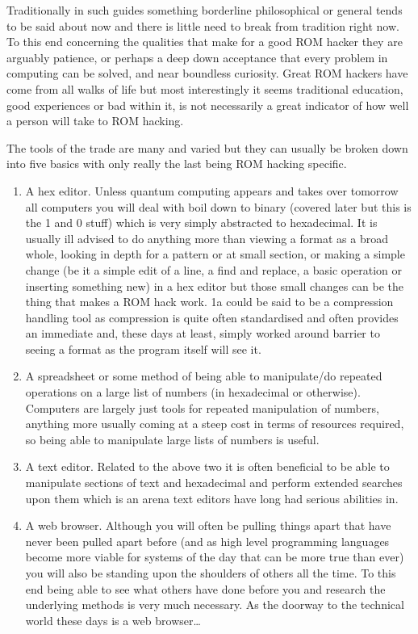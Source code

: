 \documentclass[
]{book}
\providecommand{\tightlist}{%
  \setlength{\itemsep}{0pt}\setlength{\parskip}{0pt}}
\begin{document}
Traditionally in such guides something borderline philosophical or general tends to be said about now and there is little need to break from tradition right now. To this end concerning the qualities that make for a good ROM hacker they are arguably patience, or perhaps a deep down acceptance that every problem in computing can be solved, and near boundless curiosity. Great ROM hackers have come from all walks of life but most interestingly it seems traditional education, good experiences or bad within it, is not necessarily a great indicator of how well a person will take to ROM hacking.

The tools of the trade are many and varied but they can usually be broken down into five basics with only really the last being ROM hacking specific.

\begin{enumerate}
\def\labelenumi{\arabic{enumi}.}
\tightlist
\item
  A hex editor. Unless quantum computing appears and takes over tomorrow all computers you will deal with boil down to binary (covered later but this is the 1 and 0 stuff) which is very simply abstracted to hexadecimal. It is usually ill advised to do anything more than viewing a format as a broad whole, looking in depth for a pattern or at small section, or making a simple change (be it a simple edit of a line, a find and replace, a basic operation or inserting something new) in a hex editor but those small changes can be the thing that makes a ROM hack work. 1a could be said to be a compression handling tool as compression is quite often standardised and often provides an immediate and, these days at least, simply worked around barrier to seeing a format as the program itself will see it.
\item
  A spreadsheet or some method of being able to manipulate/do repeated operations on a large list of numbers (in hexadecimal or otherwise). Computers are largely just tools for repeated manipulation of numbers, anything more usually coming at a steep cost in terms of resources required, so being able to manipulate large lists of numbers is useful.
\item
  A text editor. Related to the above two it is often beneficial to be able to manipulate sections of text and hexadecimal and perform extended searches upon them which is an arena text editors have long had serious abilities in.
\item
  A web browser. Although you will often be pulling things apart that have never been pulled apart before (and as high level programming languages become more viable for systems of the day that can be more true than ever) you will also be standing upon the shoulders of others all the time. To this end being able to see what others have done before you and research the underlying methods is very much necessary. As the doorway to the technical world these days is a web browser\ldots{}

\end{enumerate}
\end{document}
